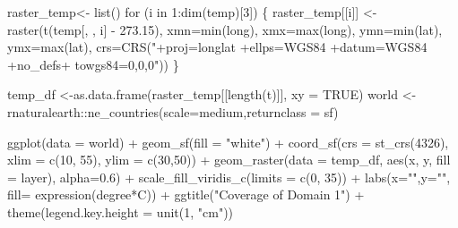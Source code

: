 \documentclass[
  letterpaper,
  DIV=11,
  numbers=noendperiod,
  abstract]{scrartcl}
\newenvironment{Shaded}{\begin{snugshade}}{\end{snugshade}}
\newcommand{\AttributeTok}[1]{\textcolor[rgb]{0.40,0.45,0.13}{#1}}
\newcommand{\ConstantTok}[1]{\textcolor[rgb]{0.56,0.35,0.01}{#1}}
\newcommand{\ControlFlowTok}[1]{\textcolor[rgb]{0.00,0.23,0.31}{#1}}
\newcommand{\DecValTok}[1]{\textcolor[rgb]{0.68,0.00,0.00}{#1}}
\newcommand{\FloatTok}[1]{\textcolor[rgb]{0.68,0.00,0.00}{#1}}
\newcommand{\FunctionTok}[1]{\textcolor[rgb]{0.28,0.35,0.67}{#1}}
\newcommand{\NormalTok}[1]{\textcolor[rgb]{0.00,0.23,0.31}{#1}}
\newcommand{\OtherTok}[1]{\textcolor[rgb]{0.00,0.23,0.31}{#1}}
\newcommand{\SpecialCharTok}[1]{\textcolor[rgb]{0.37,0.37,0.37}{#1}}
\newcommand{\StringTok}[1]{\textcolor[rgb]{0.13,0.47,0.30}{#1}}
\begin{document}
\begin{Shaded}
\begin{Highlighting}[]
\NormalTok{raster\_temp}\OtherTok{\textless{}{-}} \FunctionTok{list}\NormalTok{()}
\ControlFlowTok{for}\NormalTok{ (i }\ControlFlowTok{in} \DecValTok{1}\SpecialCharTok{:}\FunctionTok{dim}\NormalTok{(temp)[}\DecValTok{3}\NormalTok{])   \{}
\NormalTok{    raster\_temp[[i]] }\OtherTok{\textless{}{-}} \FunctionTok{raster}\NormalTok{(}\FunctionTok{t}\NormalTok{(temp[, , i] }\SpecialCharTok{{-}} \FloatTok{273.15}\NormalTok{), }
       \AttributeTok{xmn=}\FunctionTok{min}\NormalTok{(long), }\AttributeTok{xmx=}\FunctionTok{max}\NormalTok{(long),}
       \AttributeTok{ymn=}\FunctionTok{min}\NormalTok{(lat), }\AttributeTok{ymx=}\FunctionTok{max}\NormalTok{(lat), }
       \AttributeTok{crs=}\FunctionTok{CRS}\NormalTok{(}\StringTok{"+proj=longlat +ellps=WGS84 +datum=WGS84 +no\_defs+ towgs84=0,0,0"}\NormalTok{))}
\NormalTok{\}}

\NormalTok{temp\_df }\OtherTok{\textless{}{-}}\FunctionTok{as.data.frame}\NormalTok{(raster\_temp[[}\FunctionTok{length}\NormalTok{(t)]], }\AttributeTok{xy =} \ConstantTok{TRUE}\NormalTok{) }
\NormalTok{world }\OtherTok{\textless{}{-}}\NormalTok{ rnaturalearth}\SpecialCharTok{::}\FunctionTok{ne\_countries}\NormalTok{(}\AttributeTok{scale=}\StringTok{\textquotesingle{}medium\textquotesingle{}}\NormalTok{,}\AttributeTok{returnclass =} \StringTok{\textquotesingle{}sf\textquotesingle{}}\NormalTok{)}

\FunctionTok{ggplot}\NormalTok{(}\AttributeTok{data =}\NormalTok{ world)  }\SpecialCharTok{+} \FunctionTok{geom\_sf}\NormalTok{(}\AttributeTok{fill =} \StringTok{"white"}\NormalTok{) }\SpecialCharTok{+}
  \FunctionTok{coord\_sf}\NormalTok{(}\AttributeTok{crs =} \FunctionTok{st\_crs}\NormalTok{(}\DecValTok{4326}\NormalTok{), }\AttributeTok{xlim =} \FunctionTok{c}\NormalTok{(}\DecValTok{10}\NormalTok{, }\DecValTok{55}\NormalTok{), }\AttributeTok{ylim =} \FunctionTok{c}\NormalTok{(}\DecValTok{30}\NormalTok{,}\DecValTok{50}\NormalTok{)) }\SpecialCharTok{+}
  \FunctionTok{geom\_raster}\NormalTok{(}\AttributeTok{data =}\NormalTok{ temp\_df, }\FunctionTok{aes}\NormalTok{(x, y, }\AttributeTok{fill =}\NormalTok{ layer), }\AttributeTok{alpha=}\FloatTok{0.6}\NormalTok{) }\SpecialCharTok{+}
  \FunctionTok{scale\_fill\_viridis\_c}\NormalTok{(}\AttributeTok{limits =} \FunctionTok{c}\NormalTok{(}\DecValTok{0}\NormalTok{, }\DecValTok{35}\NormalTok{)) }\SpecialCharTok{+}
  \FunctionTok{labs}\NormalTok{(}\AttributeTok{x=}\StringTok{""}\NormalTok{,}\AttributeTok{y=}\StringTok{""}\NormalTok{, }\AttributeTok{fill=} \FunctionTok{expression}\NormalTok{(degree}\SpecialCharTok{*}\NormalTok{C)) }\SpecialCharTok{+} 
  \FunctionTok{ggtitle}\NormalTok{(}\StringTok{"Coverage of Domain 1"}\NormalTok{) }\SpecialCharTok{+} \FunctionTok{theme}\NormalTok{(}\AttributeTok{legend.key.height =} \FunctionTok{unit}\NormalTok{(}\DecValTok{1}\NormalTok{, }\StringTok{"cm"}\NormalTok{))}
\end{Highlighting}
\end{Shaded}
\end{document}
